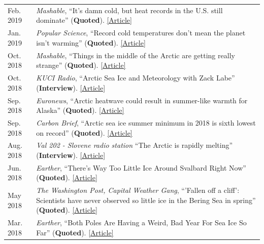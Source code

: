 \documentclass[margin,line,palatino,courier,10pt]{res}
\begin{document}
\begin{resume}
\begin{tabular}{@{}p{0.9in}p{4in}}
Feb. 2019 & \textit{Mashable}, ``It's damn cold, but heat records in the U.S. still dominate'' (\textbf{Quoted}). \href{https://mashable.com/article/polar-vortex-climate-change-cold-record/#xQmvXhcFJPqH}{[Article]}\\
Jan. 2019 & \textit{Popular Science}, ``Record cold temperatures don't mean the planet isn't warming'' (\textbf{Quoted}). \href{https://www.popsci.com/cold-weather-climate-change}{[Article]}\\
Oct. 2018 & \textit{Mashable}, ``Things in the middle of the Arctic are getting really strange'' (\textbf{Quoted}). \href{https://mashable.com/article/low-arctic-ice-central-basin/#xQmvXhcFJPqH}{[Article]}\\
Oct. 2018 & \textit{KUCI Radio}, ``Arctic Sea Ice and Meteorology with Zack Labe'' (\textbf{Interview}). \href{https://thesciencespiel.org/2018/10/08/october-8-2018-arctic-sea-ice-and-meteorology-with-zack-labe/}{[Article]}\\
Sep. 2018 & \textit{Euronews}, ``Arctic heatwave could result in summer-like warmth for Alaska'' (\textbf{Quoted}). \href{https://www.euronews.com/2018/09/29/arctic-heatwave-could-result-in-summer-like-warmth-in-alaska}{[Article]}\\
Sep. 2018 & \textit{Carbon Brief}, ``Arctic sea ice summer minimum in 2018 is sixth lowest on record'' (\textbf{Quoted}). \href{https://www.carbonbrief.org/arctic-sea-ice-summer-minimum-in-2018-is-sixth-lowest-on-record}{[Article]}\\
Aug. 2018 & \textit{Val 202 - Slovene radio station} ``The Arctic is rapidly melting'' (\textbf{Interview}). \href{https://val202.rtvslo.si/2018/08/sonce-je-odprlo-zemljin-hladilnik/}{[Article]}\\
Jun. 2018 & \textit{Earther}, ``There's Way Too Little Ice Around Svalbard Right Now'' (\textbf{Quoted}). \href{https://earther.com/theres-way-too-little-ice-around-svalbard-right-now-1826567780}{[Article]}\\
May 2018 & \textit{The Washington Post, Capital Weather Gang}, ``'Fallen off a cliff': Scientists have never observed so little ice in the Bering Sea in spring'' (\textbf{Quoted}). \href{https://www.washingtonpost.com/news/capital-weather-gang/wp/2018/05/03/fallen-off-a-cliff-scientists-have-never-observed-so-little-ice-in-the-bering-sea-in-spring/?noredirect=on&utm_term=.cbcf2781b5e4}{[Article]}\\
Mar. 2018 & \textit{Earther}, ``Both Poles Are Having a Weird, Bad Year For Sea Ice So Far'' (\textbf{Quoted}). \href{https://earther.com/both-poles-are-having-a-weird-bad-year-for-sea-ice-so-1824074352}{[Article]}\\

\end{tabular}
\end{resume}
\end{document}
